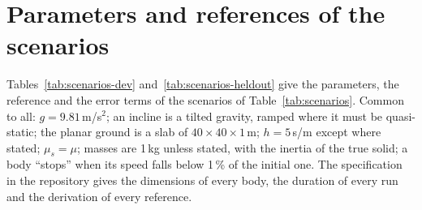 \section{Parameters and references of the scenarios}\label{app:scenarios}


Tables~\ref{tab:scenarios-dev} and~\ref{tab:scenarios-heldout} give the parameters, the reference
and the error terms of the scenarios of Table~\ref{tab:scenarios}. Common to
all: $g = 9.81$\,m/s$^2$; an incline is a tilted gravity, ramped where it must be quasi-static;
the planar ground is a slab of $40\times40\times1$\,m; $h = 5$\,s/m except where stated;
$\mu_s = \mu$; masses are 1\,kg unless stated, with the inertia of the true solid; a body
``stops'' when its speed falls below 1\,\% of the initial one. The specification in the
repository gives the dimensions of every body, the duration of every run and the derivation
of every reference.

